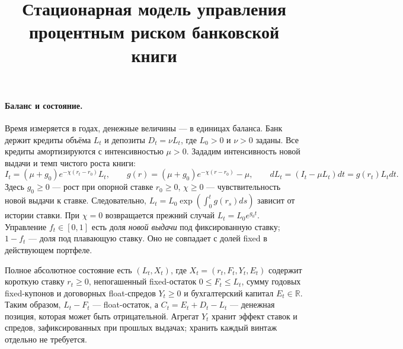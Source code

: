 \documentclass[11pt,a4paper]{article}
\title{Стационарная модель управления процентным риском банковской книги}
\author{}
\date{}
\begin{document}
\maketitle
\vspace{-1.4cm}

\paragraph{Баланс и состояние.}
Время измеряется в годах, денежные величины --- в единицах баланса.
Банк держит кредиты объёма $L_t$ и депозиты
$D_t=\nu L_t$, где $L_0>0$ и $\nu>0$ заданы.
Все кредиты амортизируются с интенсивностью $\mu>0$.
Зададим интенсивность новой выдачи и темп чистого роста книги:
\begin{equation}
 I_t=(\mu+g_0)e^{-\chi(r_t-r_0)}L_t,\qquad
 g(r)=(\mu+g_0)e^{-\chi(r-r_0)}-\mu,\qquad
 dL_t=(I_t-\mu L_t)dt=g(r_t)L_tdt.
 \label{eq:growth}
\end{equation}
Здесь $g_0\geq0$ --- рост при опорной ставке $r_0\geq0$,
$\chi\geq0$ --- чувствительность новой выдачи к ставке.
Следовательно, $L_t=L_0\exp(\int_0^t g(r_s)ds)$ зависит от истории
ставки. При $\chi=0$ возвращается прежний случай $L_t=L_0e^{g_0t}$.
Управление $f_t\in[0,1]$ есть доля \emph{новой выдачи} под
фиксированную ставку; $1-f_t$ --- доля под плавающую ставку.
Оно не совпадает с долей fixed в действующем портфеле.

Полное абсолютное состояние есть $(L_t,X_t)$, где
$X_t=(r_t,F_t,Y_t,E_t)$ содержит короткую ставку
$r_t\geq0$, непогашенный fixed-остаток $0\leq F_t\leq L_t$,
сумму годовых fixed-купонов и договорных float-спредов $Y_t\geq0$
и бухгалтерский капитал $E_t\in\mathbb R$.
Таким образом, $L_t-F_t$ --- float-остаток, а
$C_t=E_t+D_t-L_t$ --- денежная позиция, которая может быть
отрицательной. Агрегат $Y_t$ хранит эффект ставок и спредов,
зафиксированных при прошлых выдачах; хранить каждый винтаж отдельно
не требуется.
\end{document}
